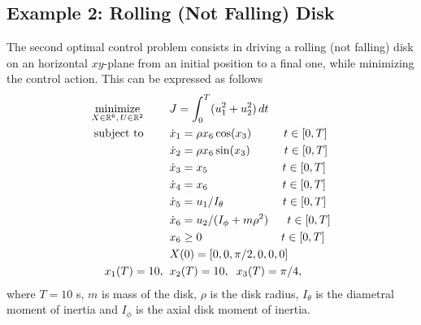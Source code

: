 \subsection*{Example 2: Rolling (Not Falling) Disk}
The second optimal control problem consists in driving a rolling (not falling) disk on an horizontal $xy$-plane from an initial position to a final one, while minimizing the control action. This can be expressed as follows
\begin{subequations}\label{eq:disk}
	\begin{align}
	\underset{X \in \mathbb{R}^{6}, \, U \in \mathbb{R}^{2}}{\text{minimize}}\hspace{8mm}
	&J = \int_{0}^{T}(u_{1}^{2} +  u_{2}^{2})\,dt  \label{eq:diskcost}\\
	\text{subject to} \hspace{8mm}
	& \dot{x}_1 = \rho x_6  \cos(x_3) \hspace{10mm} t \in[0,T] \label{eq:diskdyn1}\\
	& \dot{x}_2 = \rho x_6  \sin(x_3)\hspace{10.5mm} t \in[0,T] \label{eq:diskdyn2}\\
	& \dot{x}_3 = x_5\hspace{23mm} t \in[0,T] \label{eq:diskdyn3}\\
	& \dot{x}_4 = x_6\hspace{23mm} t \in[0,T] \label{eq:diskdyn4}\\
	& \dot{x}_5 = u_1/I_{\theta}\hspace{18.2mm} t \in[0,T] \label{eq:diskdyn5}\\
	& \dot{x}_6 = u_2/(I_{\phi} + m \rho^{2})\hspace{5.8mm} t \in[0,T] \label{eq:diskdyn6}\\
	& x_6 \geq 0  \hspace{24.5mm} t \in[0,T]\\
	&X(0) = [0, 0, \pi/2, 0, 0, 0]\\	
	 x_1(T) = 10,\hspace{2mm} &x_2(T) = 10, \hspace{2mm} x_3(T) = \pi/4, \label{eq:diskfinal1}		
	\end{align}
\end{subequations}
where $T = 10$ s, $m$ is mass of the disk, $\rho$ is the disk radius, $I_{\theta}$ is the diametral moment of inertia and
$I_{\phi}$ is the axial disk moment of inertia.
